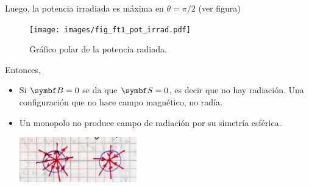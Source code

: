 \documentclass[10pt,oneside]{CBFT_book}
\begin{document}
Luego, la potencia irradiada es máxima en $\theta=\pi/2$ (ver figura)

\begin{figure}[htb]
	\begin{center}
	\texttt{[image: images/fig\_ft1\_pot\_irrad.pdf]}	 
	\end{center}
	\caption{Gráfico polar de la potencia radiada.}
\end{figure} 

Entonces, 
\begin{itemize}
 \item Si $\vb{B}=0$ se da que $\vb{S}=0$, es decir que no hay radiación. Una configuración
 que no hace campo magnético, no radía.
 \item Un monopolo no produce campo de radiación por su simetría esférica.
 
 \includegraphics[width=0.4\textwidth]{images/fig_ft1_radiacion_esferica_no.jpg}
 

\end{itemize}
\end{document}
